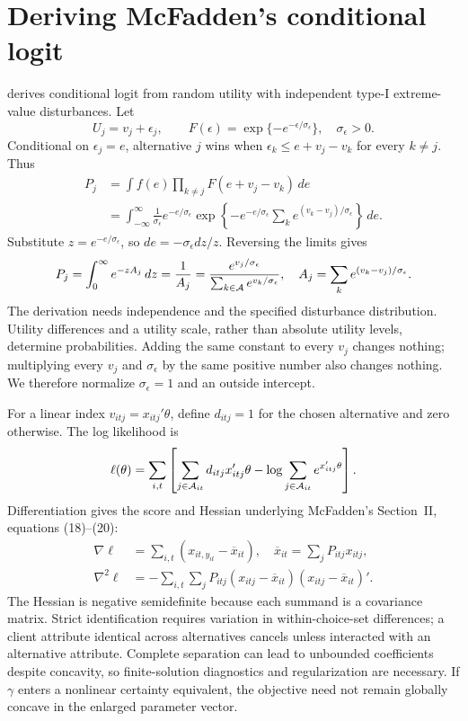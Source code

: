 \section{Deriving McFadden's conditional logit}
\citet[Section I, equations (12)--(13)]{mcfadden1974} derives conditional logit from random utility with independent type-I extreme-value disturbances. Let
\begin{equation}
U_j=v_j+\epsilon_j,\qquad
F(\epsilon)=\exp\{-e^{-\epsilon/\sigma_\epsilon}\},\quad\sigma_\epsilon>0.
\end{equation}
Conditional on $\epsilon_j=e$, alternative $j$ wins when
$\epsilon_k\leq e+v_j-v_k$ for every $k\ne j$. Thus
\begin{align}
P_j&=\int f(e)\prod_{k\ne j}F(e+v_j-v_k)\,de\\
&=\int_{-\infty}^{\infty}\frac1{\sigma_\epsilon}e^{-e/\sigma_\epsilon}
\exp\left\{-e^{-e/\sigma_\epsilon}
 \sum_k e^{(v_k-v_j)/\sigma_\epsilon}\right\}\,de.
\end{align}
Substitute $z=e^{-e/\sigma_\epsilon}$, so $de=-\sigma_\epsilon dz/z$. Reversing the limits gives
\begin{equation}
P_j=\int_0^\infty e^{-zA_j}\,dz=\frac1{A_j}
=\frac{e^{v_j/\sigma_\epsilon}}{\sum_{k\in\mathcal A}e^{v_k/\sigma_\epsilon}},
\quad A_j=\sum_k e^{(v_k-v_j)/\sigma_\epsilon}.
\label{eq:logit}
\end{equation}
The derivation needs independence and the specified disturbance distribution. Utility differences and a utility scale, rather than absolute utility levels, determine probabilities. Adding the same constant to every $v_j$ changes nothing; multiplying every $v_j$ and $\sigma_\epsilon$ by the same positive number also changes nothing. We therefore normalize $\sigma_\epsilon=1$ and an outside intercept.

For a linear index $v_{itj}=x_{itj}'\theta$, define $d_{itj}=1$ for the chosen alternative and zero otherwise. The log likelihood is
\begin{equation}
\ell(\theta)=\sum_{i,t}\left[
\sum_{j\in\mathcal A_{it}}d_{itj}x_{itj}'\theta
-\log\sum_{j\in\mathcal A_{it}}e^{x_{itj}'\theta}\right].
\label{eq:logitlik}
\end{equation}
Differentiation gives the score and Hessian underlying McFadden's Section~II, equations (18)--(20):
\begin{align}
\nabla\ell&=\sum_{i,t}\left(x_{it,y_{it}}-\overline x_{it}\right),
\quad\overline x_{it}=\sum_jP_{itj}x_{itj},\\
\nabla^2\ell&=-\sum_{i,t}\sum_jP_{itj}
(x_{itj}-\overline x_{it})(x_{itj}-\overline x_{it})'.
\label{eq:logithess}
\end{align}
The Hessian is negative semidefinite because each summand is a covariance matrix. Strict identification requires variation in within-choice-set differences; a client attribute identical across alternatives cancels unless interacted with an alternative attribute. Complete separation can lead to unbounded coefficients despite concavity, so finite-solution diagnostics and regularization are necessary. If $\gamma$ enters a nonlinear certainty equivalent, the objective need not remain globally concave in the enlarged parameter vector.


